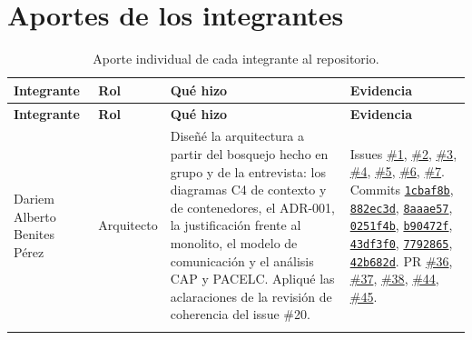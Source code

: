 \section{Aportes de los integrantes}
\label{sec:aportes}

\begin{xltabular}{\textwidth}{@{} >{\raggedright\arraybackslash}p{2.6cm} >{\raggedright\arraybackslash}p{2.4cm} >{\raggedright\arraybackslash}p{5.0cm} >{\raggedright\arraybackslash}p{4.0cm} @{}}
  \caption{Aporte individual de cada integrante al repositorio.}
  \label{tab:aportes} \\
  \toprule
  \textbf{Integrante} & \textbf{Rol} & \textbf{Qué hizo} & \textbf{Evidencia} \\
  \midrule
  \endfirsthead
  \toprule
  \textbf{Integrante} & \textbf{Rol} & \textbf{Qué hizo} & \textbf{Evidencia} \\
  \midrule
  \endhead
  \bottomrule
  \endfoot

  Dariem Alberto Benites Pérez & Arquitecto &
  Diseñé la arquitectura a partir del bosquejo hecho en grupo y de la
  entrevista: los diagramas C4 de contexto y de contenedores, el ADR-001,
  la justificación frente al monolito, el modelo de comunicación y el
  análisis CAP y PACELC. Apliqué las aclaraciones de la revisión de
  coherencia del issue \#20. &
  Issues \href{https://github.com/reyshadow0/isr701-pfc/issues/1}{\#1}, \href{https://github.com/reyshadow0/isr701-pfc/issues/2}{\#2}, \href{https://github.com/reyshadow0/isr701-pfc/issues/3}{\#3}, \href{https://github.com/reyshadow0/isr701-pfc/issues/4}{\#4}, \href{https://github.com/reyshadow0/isr701-pfc/issues/5}{\#5}, \href{https://github.com/reyshadow0/isr701-pfc/issues/6}{\#6}, \href{https://github.com/reyshadow0/isr701-pfc/issues/7}{\#7}.
  Commits \href{https://github.com/reyshadow0/isr701-pfc/commit/1cbaf8b}{\texttt{1cbaf8b}}, \href{https://github.com/reyshadow0/isr701-pfc/commit/882ec3d}{\texttt{882ec3d}}, \href{https://github.com/reyshadow0/isr701-pfc/commit/8aaae57}{\texttt{8aaae57}}, \href{https://github.com/reyshadow0/isr701-pfc/commit/0251f4b}{\texttt{0251f4b}}, \href{https://github.com/reyshadow0/isr701-pfc/commit/b90472f}{\texttt{b90472f}}, \href{https://github.com/reyshadow0/isr701-pfc/commit/43df3f0}{\texttt{43df3f0}}, \href{https://github.com/reyshadow0/isr701-pfc/commit/7792865}{\texttt{7792865}}, \href{https://github.com/reyshadow0/isr701-pfc/commit/42b682d}{\texttt{42b682d}}.
  PR \href{https://github.com/reyshadow0/isr701-pfc/pull/36}{\#36}, \href{https://github.com/reyshadow0/isr701-pfc/pull/37}{\#37}, \href{https://github.com/reyshadow0/isr701-pfc/pull/38}{\#38}, \href{https://github.com/reyshadow0/isr701-pfc/pull/44}{\#44}, \href{https://github.com/reyshadow0/isr701-pfc/pull/45}{\#45}. \\
  \addlinespace


\end{xltabular}
